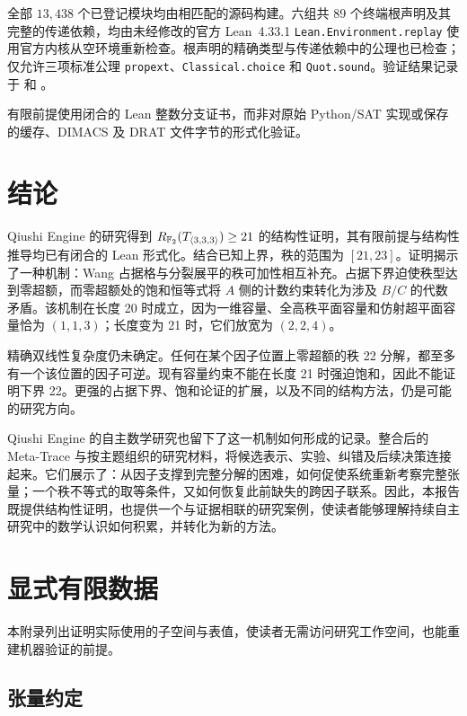 \documentclass[11pt,a4paper]{article}
\begin{document}
全部 $13{,}438$ 个已登记模块均由相匹配的源码构建。六组共 89 个终端根声明及其完整的传递依赖，均由未经修改的官方 Lean~4.33.1 \texttt{Lean.Environment.replay} 使用官方内核从空环境重新检查。根声明的精确类型与传递依赖中的公理也已检查；仅允许三项标准公理 \texttt{propext}、\texttt{Classical.choice} 和 \texttt{Quot.sound}。验证结果记录于  和 。

有限前提使用闭合的 Lean 整数分支证书，而非对原始 Python/SAT 实现或保存的缓存、DIMACS 及 DRAT 文件字节的形式化验证。

\section{结论}

Qiushi Engine 的研究得到 $R_{\mathbb{F}_2}(T_{\langle3,3,3\rangle})\ge21$ 的结构性证明，其有限前提与结构性推导均已有闭合的 Lean 形式化。结合已知上界，秩的范围为 $[21,23]$。证明揭示了一种机制：Wang 占据格与分裂展平的秩可加性相互补充。占据下界迫使秩型达到零超额，而零超额处的饱和恒等式将 $A$ 侧的计数约束转化为涉及 $B/C$ 的代数矛盾。该机制在长度 20 时成立，因为一维容量、全高秩平面容量和仿射超平面容量恰为 $(1,1,3)$；长度变为 21 时，它们放宽为 $(2,2,4)$。

精确双线性复杂度仍未确定。任何在某个因子位置上零超额的秩 22 分解，都至多有一个该位置的因子可逆。现有容量约束不能在长度 21 时强迫饱和，因此不能证明下界 22。更强的占据下界、饱和论证的扩展，以及不同的结构方法，仍是可能的研究方向。

Qiushi Engine 的自主数学研究也留下了这一机制如何形成的记录。整合后的 Meta-Trace 与按主题组织的研究材料，将候选表示、实验、纠错及后续决策连接起来。它们展示了：从因子支撑到完整分解的困难，如何促使系统重新考察完整张量；一个秩不等式的取等条件，又如何恢复此前缺失的跨因子联系。因此，本报告既提供结构性证明，也提供一个与证据相联的研究案例，使读者能够理解持续自主研究中的数学认识如何积累，并转化为新的方法。

\bigskip
\appendix
\section{显式有限数据}\label{app:data}

本附录列出证明实际使用的子空间与表值，使读者无需访问研究工作空间，也能重建机器验证的前提。

\subsection{张量约定}
\end{document}
